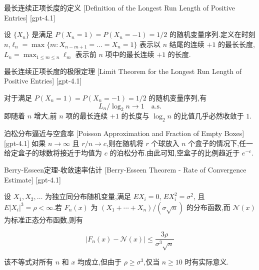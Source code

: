 \documentclass[UTF8]{ctexart}
\begin{document}
    
    
    \begin{dfn}
        {最长连续正项长度的定义}
        [Definition of the Longest Run Length of Positive Entries]
        [gpt-4.1]
        
设 $\{X_n\}$ 是满足 $P(X_{n}=1) = P(X_{n}=-1) = 1/2$ 的随机变量序列.定义在时刻 $n$,$\ell_{n} = \max\{m : X_{n-m+1} = \ldots = X_{n} = 1\}$ 表示以 $n$ 结尾的连续 $+1$ 的最长长度,$L_{n} = \max_{1 \leq m \leq n} \ell_{m}$ 表示前 $n$ 项中的最长连续 $+1$ 的长度.

    \end{dfn}
    
    
    
    \begin{thm}
        {最长连续正项长度的极限定理}
        [Limit Theorem for the Longest Run Length of Positive Entries]
        [gpt-4.1]
        
对于满足 $P(X_{n}=1) = P(X_{n}=-1) = 1/2$ 的随机变量序列,有
\[
L_{n} / \log_{2} n \to 1 \quad \text{a.s.}
\]
即随着 $n$ 增大,前 $n$ 项的最长连续 $+1$ 的长度与 $\log_2 n$ 的比值几乎必然收敛于 $1$.

    \end{thm}
    
    
    
    \begin{thm}
        {泊松分布逼近与空盒率}
        [Poisson Approximation and Fraction of Empty Boxes]
        [gpt-4.1]
        如果 $n \to \infty$ 且 $r / n \to c$,则在随机将 $r$ 个球放入 $n$ 个盒子的情况下,任一给定盒子的球数将接近于均值为 $c$ 的泊松分布.由此可知,空盒子的比例趋近于 $e^{-c}$.
    \end{thm}
    
    
    
    \begin{thm}
        {Berry-Esseen定理-收敛速率估计}
        [Berry-Esseen Theorem - Rate of Convergence Estimate]
        [gpt-4.1]
        
设 $X_{1}, X_{2}, \dots$ 为独立同分布随机变量,满足 $E X_{i} = 0$, $E X_{i}^{2} = \sigma^{2}$, 且 $E|X_{i}|^{3} = \rho < \infty$.若 $F_{n}(x)$ 为 $(X_{1} + \cdots + X_{n}) / (\sigma \sqrt{n})$ 的分布函数,而 $\mathcal{N}(x)$ 为标准正态分布函数,则有

\[
| F_{n}(x) - \mathcal{N}(x) | \leq \frac{3\rho}{\sigma^{3} \sqrt{n}}
\]

该不等式对所有 $n$ 和 $x$ 均成立,但由于 $\rho \geq \sigma^{3}$,仅当 $n \geq 10$ 时有实际意义.

    \end{thm}
    
\end{document}
